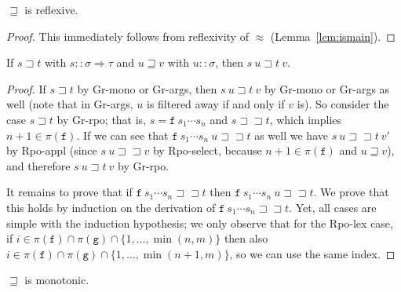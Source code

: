 \documentclass[a4paper,USenglish,cleveref,autoref,thm-restate]{lipics-v2021}
\newcommand{\arrtype}{\Rightarrow}
\newcommand{\grmain}{\sqsupset}
\newcommand{\geqmain}{\sqsupseteq}
\newcommand{\ismain}{\approx}
\newcommand{\rpomain}{\sqsupset\!\!\sqsupset}
\newcommand{\symb}[1]{\mathtt{#1}}
\newcommand{\afun}{\symb{f}}
\newcommand{\bfun}{\symb{g}}
\newcommand{\atype}{\sigma}
\newcommand{\btype}{\tau}
\newcommand{\filter}{\pi}
\begin{document}
\begin{lemma}\label{lem:reflexive}
$\geqmain$ is reflexive.
\end{lemma}

\begin{proof}
This immediately follows from reflexivity of $\ismain$ (Lemma~\ref{lem:ismain}).
\end{proof}

\begin{lemma}\label{lem:leftmono}
If $s \grmain t$ with $s :: \atype \arrtype \btype$ and $u \geqmain v$ with $u :: \atype$, then
$s\ u \grmain t\ v$.
\end{lemma}

\begin{proof}
If $s \grmain t$ by Gr-mono or Gr-args, then $s\ u \grmain t\ v$ by Gr-mono or Gr-args as well
(note that in Gr-args, $u$ is filtered away if and only if $v$ is).  So consider the case
$s \grmain t$ by Gr-rpo; that is, $s =  \afun\ s_1 \cdots s_n$ and $s \rpomain t$, which implies
$n+1 \in \filter(\afun)$.  If we can see that $\afun\ s_1 \cdots s_n\ u \rpomain t$ as
well we have $s\ u \rpomain t\ v'$ by Rpo-appl (since $s\ u \rpomain v$ by Rpo-select, because
$n+1 \in \filter(\afun)$ and $u \geqmain v$), and therefore $s\ u \grmain t\ v$ by Gr-rpo.

It remains to prove that if $\afun\ s_1 \cdots s_n \rpomain t$ then $\afun\ s_1 \cdots s_n\ u
\rpomain t$.  We prove that this holds by induction on the derivation of $\afun\ s_1 \cdots s_n
\rpomain t$.  Yet, all cases are simple with the induction hypothesis; we only observe that for
the Rpo-lex case, if $i \in \filter(\afun) \cap \filter(\bfun) \cap \{1,\dots,\min(n,m)\}$ then
also $i \in \filter(\afun) \cap \filter(\bfun) \cap \{1,\dots,\min(n+1,m)\}$, so we can use the
same index.
\end{proof}

\begin{lemma}\label{lem:monotonic}
$\geqmain$ is monotonic.
\end{lemma}
\end{document}
